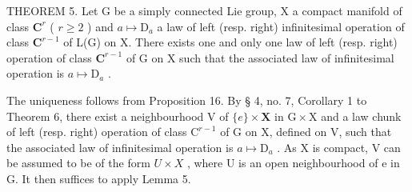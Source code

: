 THEOREM 5. Let G be a simply connected Lie group, X a compact manifold of class \(\mathbf{C}^r\) ( \(r \geqslant 2\) ) and \(a \mapsto \mathrm{D}_a\) a law of left (resp. right) infinitesimal operation of class \(\mathbf{C}^{r-1}\) of L(G) on X. There exists one and only one law of left (resp. right) operation of class \(\mathbf{C}^{r-1}\) of G on X such that the associated law of infinitesimal operation is \(a \mapsto \mathrm{D}_a\) .

The uniqueness follows from Proposition 16. By § 4, no. 7, Corollary 1 to Theorem 6, there exist a neighbourhood V of \(\{e\} \times \mathbf{X}\) in \(\mathrm{G} \times \mathrm{X}\) and a law chunk of left (resp. right) operation of class \(\mathrm{C}^{r-1}\) of G on X, defined on V, such that the associated law of infinitesimal operation is \(a \mapsto \mathrm{D}_a\) . As X is compact, V can be assumed to be of the form \(U \times X\) , where U is an open neighbourhood of e in G. It then suffices to apply Lemma 5.
